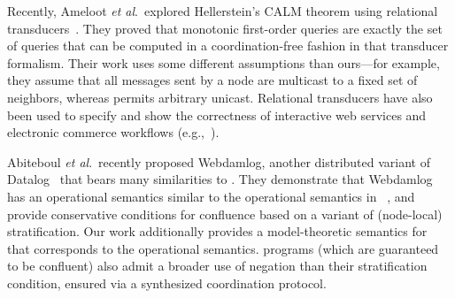 Recently, Ameloot \emph{et al}.\ explored Hellerstein's CALM theorem using
relational transducers~\cite{relational-transducers}.  They proved that
monotonic first-order queries are exactly the set of queries that can be
computed in a coordination-free fashion in that transducer formalism.  Their
work uses some different assumptions than ours---for example, they assume that
all messages sent by a node are multicast to a fixed set of neighbors, whereas
\lang permits arbitrary unicast. Relational transducers have also been used to
specify and show the correctness of interactive web services and electronic
commerce workflows
(e.g.,~\cite{trans-ecommerce,deutsch-icdt,deutsch-web-app}).%

Abiteboul \emph{et al}.\ recently proposed Webdamlog, another distributed variant of
Datalog~\cite{Abiteboul2011} that bears many similarities to \lang.  They demonstrate that Webdamlog has an
operational semantics similar to the operational semantics in \lang~\cite{ameloot-operational},
and provide conservative conditions for confluence based on a variant of (node-local) stratification.
Our work additionally provides a model-theoretic semantics for \plang that corresponds to the operational semantics.  
\plang programs (which are guaranteed to be confluent) 
also admit a broader use of negation than their stratification condition, ensured via a synthesized
coordination protocol.

